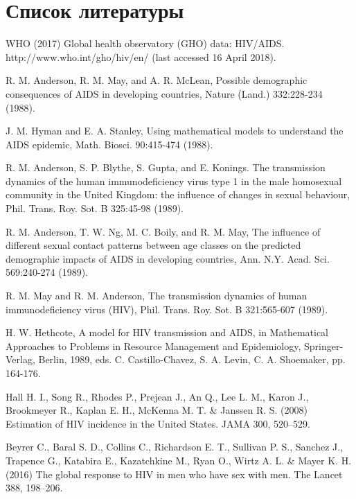 \documentclass[a4paper]{report}
\begin{document}
	\chapter*{Список литературы}
	\begin{thebibliography}{99}
		
		WHO (2017) Global health observatory (GHO) data: HIV/AIDS. http://www.who.int/gho/hiv/en/ (last accessed 16 April 2018).
				
		R. M. Anderson, R. M. May, and A. R. McLean, Possible demographic consequences of AIDS in developing countries, Nature (Land.) 332:228-234 (1988).
		
		J. M. Hyman and E. A. Stanley, Using mathematical models to understand the AIDS epidemic, Math. Biosci. 90:415-474 (1988).
		
		R. M. Anderson, S. P. Blythe, S. Gupta, and E. Konings. The transmission dynamics of the human immunodeficiency virus type 1 in the male homosexual community in the United Kingdom: the influence of changes in sexual behaviour, Phil. Trans. Roy. Sot. B 325:45-98 (1989).
		
		R. M. Anderson, T. W. Ng, M. C. Boily, and R. M. May, The influence of different
		sexual contact patterns between age classes on the predicted demographic impacts of
		AIDS in developing countries, Ann. N.Y. Acad. Sci. 569:240-274 (1989). 
		
		R. M. May and R. M. Anderson, The transmission dynamics of human immunodeficiency
		virus (HIV), Phil. Trans. Roy. Sot. B 321:565-607 (1989).
		
		H. W. Hethcote, A model for HIV transmission and AIDS, in Mathematical Approaches to Problems in Resource Management and Epidemiology, Springer-Verlag, Berlin, 1989, eds. C. Castillo-Chavez, S. A. Levin, C. A. Shoemaker, pp. 164-176.
		
		Hall H. I., Song R., Rhodes P., Prejean J., An Q., Lee L. M., Karon J., Brookmeyer R., Kaplan E. H., McKenna M. T. \& Janssen R. S. (2008) Estimation of HIV incidence in the United States. JAMA 300, 520–529.
		
		Beyrer C., Baral S. D., Collins C., Richardson E. T., Sullivan P. S., Sanchez J., Trapence G., Katabira E., Kazatchkine M., Ryan O., Wirtz A. L. \& Mayer K. H. (2016) The global response to HIV in men who have sex with men. The Lancet 388, 198–206.
		

\end{thebibliography}
\end{document}
